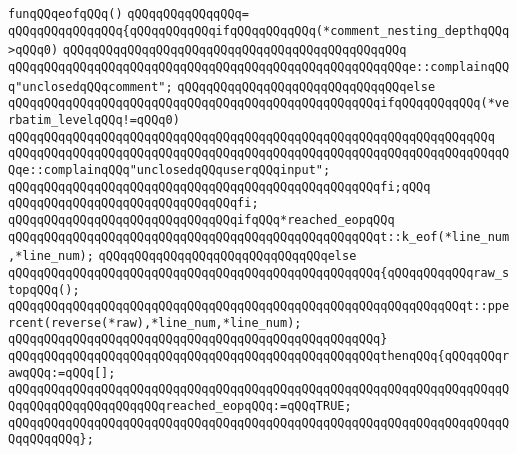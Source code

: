 \newline
\newline
\verb|funqQQqeofqQQq()|\newline
\verb|qQQqqQQqqQQqqQQq=|\newline
\verb|qQQqqQQqqQQqqQQq{qQQqqQQqqQQqifqQQqqQQqqQQq(*comment_nesting_depthqQQq>qQQq0)|\newline
\verb|qQQqqQQqqQQqqQQqqQQqqQQqqQQqqQQqqQQqqQQqqQQqqQQq|\newline
\verb|qQQqqQQqqQQqqQQqqQQqqQQqqQQqqQQqqQQqqQQqqQQqqQQqqQQqqQQqe::complainqQQq"unclosedqQQqcomment";|\newline
\verb|qQQqqQQqqQQqqQQqqQQqqQQqqQQqqQQqelse|\newline
\verb|qQQqqQQqqQQqqQQqqQQqqQQqqQQqqQQqqQQqqQQqqQQqqQQqqQQqifqQQqqQQqqQQq(*verbatim_levelqQQq!=qQQq0)|\newline
\verb|qQQqqQQqqQQqqQQqqQQqqQQqqQQqqQQqqQQqqQQqqQQqqQQqqQQqqQQqqQQqqQQqqQQq|\newline
\verb|qQQqqQQqqQQqqQQqqQQqqQQqqQQqqQQqqQQqqQQqqQQqqQQqqQQqqQQqqQQqqQQqqQQqqQQqe::complainqQQq"unclosedqQQquserqQQqinput";|\newline
\verb|qQQqqQQqqQQqqQQqqQQqqQQqqQQqqQQqqQQqqQQqqQQqqQQqqQQqfi;qQQq|\newline
\verb|qQQqqQQqqQQqqQQqqQQqqQQqqQQqqQQqfi;|\newline
\newline
\verb|qQQqqQQqqQQqqQQqqQQqqQQqqQQqqQQqifqQQq*reached_eopqQQq|\newline
\newline
\verb|qQQqqQQqqQQqqQQqqQQqqQQqqQQqqQQqqQQqqQQqqQQqqQQqqQQqt::k_eof(*line_num,*line_num);|\newline
\verb|qQQqqQQqqQQqqQQqqQQqqQQqqQQqqQQqelse|\newline
\verb|qQQqqQQqqQQqqQQqqQQqqQQqqQQqqQQqqQQqqQQqqQQqqQQqqQQq{qQQqqQQqqQQqraw_stopqQQq();|\newline
\newline
\verb|qQQqqQQqqQQqqQQqqQQqqQQqqQQqqQQqqQQqqQQqqQQqqQQqqQQqqQQqqQQqqQQqt::ppercent(reverse(*raw),*line_num,*line_num);|\newline
\verb|qQQqqQQqqQQqqQQqqQQqqQQqqQQqqQQqqQQqqQQqqQQqqQQqqQQq}|\newline
\verb|qQQqqQQqqQQqqQQqqQQqqQQqqQQqqQQqqQQqqQQqqQQqqQQqqQQqthenqQQq{qQQqqQQqrawqQQq:=qQQq[];|\newline
\verb|qQQqqQQqqQQqqQQqqQQqqQQqqQQqqQQqqQQqqQQqqQQqqQQqqQQqqQQqqQQqqQQqqQQqqQQqqQQqqQQqqQQqqQQqqQQqreached_eopqQQq:=qQQqTRUE;|\newline
\verb|qQQqqQQqqQQqqQQqqQQqqQQqqQQqqQQqqQQqqQQqqQQqqQQqqQQqqQQqqQQqqQQqqQQqqQQqqQQqqQQq};|\newline
